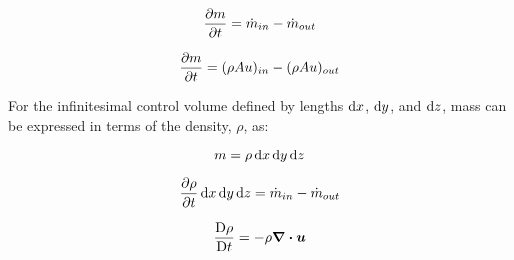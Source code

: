 \documentclass[11pt, oneside]{article}   	%
\newcommand{\vect}[1]{\boldsymbol{#1}} %
\begin{document}
\begin{equation}
\pdv{m}{t} = \dot{m}_{in} - \dot{m}_{out}
\end{equation}

\begin{equation}
\pdv{m}{t} = (\rho A u)_{in} - (\rho A u)_{out}
\end{equation}

\noindent
For the infinitesimal control volume defined by lengths $\dif x$, $\dif y$, and $\dif z$, mass can be expressed in terms of the density, $\rho$, as:

\begin{equation}
m = \rho \dif x \dif y \dif z
\end{equation}

\begin{equation}
\pdv{\rho}{t} \dif x \dif y \dif z = \dot{m}_{in} - \dot{m}_{out}
\end{equation}

\begin{equation}
\frac{\Dif \rho}{\Dif t}   = - \rho \div \vect{u}
\end{equation}
\end{document}
